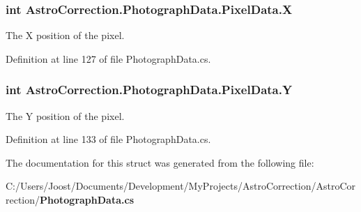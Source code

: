 \subsubsection[{X}]{\setlength{\rightskip}{0pt plus 5cm}int {\bf AstroCorrection.PhotographData.PixelData.X}}\label{struct_astro_correction_1_1_photograph_data_1_1_pixel_data_a04d397b93dfe74bdfb4cecaa4f3e7844}


The X position of the pixel. 

Definition at line 127 of file PhotographData.cs.
\subsubsection[{Y}]{\setlength{\rightskip}{0pt plus 5cm}int {\bf AstroCorrection.PhotographData.PixelData.Y}}\label{struct_astro_correction_1_1_photograph_data_1_1_pixel_data_a79dd8f17fff4962da18d3db66cc2d4e0}


The Y position of the pixel. 

Definition at line 133 of file PhotographData.cs.

The documentation for this struct was generated from the following file:\begin{DoxyCompactItemize}
\item 
C:/Users/Joost/Documents/Development/MyProjects/AstroCorrection/AstroCorrection/{\bf PhotographData.cs}\end{DoxyCompactItemize}
